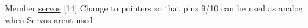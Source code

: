 
\begin{DoxyRefList}
\item[Member \mbox{\hyperlink{Functions_8cpp_aff09337585aa6e2bea50fcaddc065c50}{servos}} \mbox{[}14\mbox{]}]\label{todo__todo000001}%
%
Change to pointers so that pins 9/10 can be used as analog when Servos aren\textquotesingle{}t used 
\end{DoxyRefList}